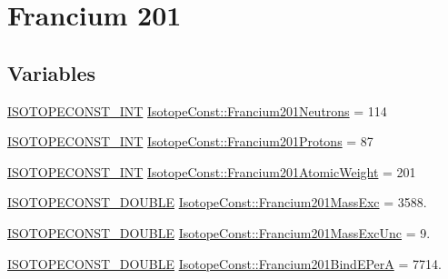 \hypertarget{group___isotope_const-_francium-_fr201}{}\section{Francium 201}
\label{group___isotope_const-_francium-_fr201}
\subsection*{Variables}
\begin{DoxyCompactItemize}
\item 
\mbox{\hyperlink{group___isotope_const-_macros_ga5f18360b3e99483a35c32d789e62621c}{I\+S\+O\+T\+O\+P\+E\+C\+O\+N\+S\+T\+\_\+\+I\+NT}} \mbox{\hyperlink{group___isotope_const-_francium-_fr201_ga380da91c6e52a0ac8e2b1dd6a236fa5c}{Isotope\+Const\+::\+Francium201\+Neutrons}} = 114
\item 
\mbox{\hyperlink{group___isotope_const-_macros_ga5f18360b3e99483a35c32d789e62621c}{I\+S\+O\+T\+O\+P\+E\+C\+O\+N\+S\+T\+\_\+\+I\+NT}} \mbox{\hyperlink{group___isotope_const-_francium-_fr201_gab5d34dc4f22e942e8eb7e91eb7103d74}{Isotope\+Const\+::\+Francium201\+Protons}} = 87
\item 
\mbox{\hyperlink{group___isotope_const-_macros_ga5f18360b3e99483a35c32d789e62621c}{I\+S\+O\+T\+O\+P\+E\+C\+O\+N\+S\+T\+\_\+\+I\+NT}} \mbox{\hyperlink{group___isotope_const-_francium-_fr201_gaa82729b241877c0d59be0ab498f624e1}{Isotope\+Const\+::\+Francium201\+Atomic\+Weight}} = 201
\item 
\mbox{\hyperlink{group___isotope_const-_macros_ga8f45a7272ce02c0b4c65c44636ed719a}{I\+S\+O\+T\+O\+P\+E\+C\+O\+N\+S\+T\+\_\+\+D\+O\+U\+B\+LE}} \mbox{\hyperlink{group___isotope_const-_francium-_fr201_gae5bbffb6d05b4e87c7d522e3156b79f5}{Isotope\+Const\+::\+Francium201\+Mass\+Exc}} = 3588.
\item 
\mbox{\hyperlink{group___isotope_const-_macros_ga8f45a7272ce02c0b4c65c44636ed719a}{I\+S\+O\+T\+O\+P\+E\+C\+O\+N\+S\+T\+\_\+\+D\+O\+U\+B\+LE}} \mbox{\hyperlink{group___isotope_const-_francium-_fr201_ga0cddde255673679e5829d30cd3dc9c80}{Isotope\+Const\+::\+Francium201\+Mass\+Exc\+Unc}} = 9.
\item 
\mbox{\hyperlink{group___isotope_const-_macros_ga8f45a7272ce02c0b4c65c44636ed719a}{I\+S\+O\+T\+O\+P\+E\+C\+O\+N\+S\+T\+\_\+\+D\+O\+U\+B\+LE}} \mbox{\hyperlink{group___isotope_const-_francium-_fr201_gac3f482856d1e5dbf1f87ba2af2510138}{Isotope\+Const\+::\+Francium201\+Bind\+E\+PerA}} = 7714.
\item 

\end{DoxyCompactItemize}

